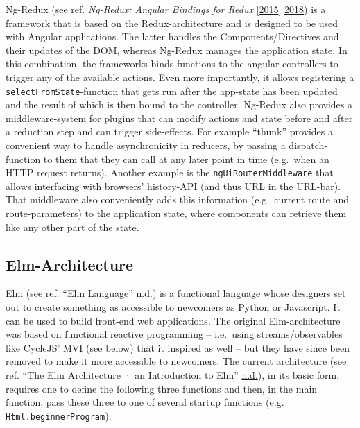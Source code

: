 \documentclass[a4paper,,tablecaptionabove]{scrbook}
\newcommand{\passthrough}[1]{#1}
\begin{document}
Ng-Redux (see ref. \emph{Ng-Redux: Angular Bindings for Redux}
{[}\protect\hyperlink{ref-ngreduxAngularbindings2018}{2015}{]}
\protect\hyperlink{ref-ngreduxAngularbindings2018}{2018}) is a framework
that is based on the Redux-architecture and is designed to be used with
Angular applications. The latter handles the Components/Directives and
their updates of the DOM, whereas Ng-Redux manages the application
state. In this combination, the frameworks binds functions to the
angular controllers to trigger any of the available actions. Even more
importantly, it allows registering a
\passthrough{\lstinline!selectFromState!}-function that gets run after
the app-state has been updated and the result of which is then bound to
the controller. Ng-Redux also provides a middleware-system for plugins
that can modify actions and state before and after a reduction step and
can trigger side-effects. For example \enquote{thunk} provides a
convenient way to handle asynchronicity in reducers, by passing a
dispatch-function to them that they can call at any later point in time
(e.g.~when an HTTP request returns). Another example is the
\passthrough{\lstinline!ngUiRouterMiddleware!} that allows interfacing
with browsers' history-API (and thus URL in the URL-bar). That
middleware also conveniently adds this information (e.g.~current route
and route-parameters) to the application state, where components can
retrieve them like any other part of the state.

\hypertarget{sec:elm-architecture}{%
\subsection{Elm-Architecture}\label{sec:elm-architecture}}

Elm (see ref. ``Elm Language''
\protect\hyperlink{ref-ElmLanguage}{n.d.}) is a functional language
whose designers set out to create something as accessible to newcomers
as Python or Javascript. It can be used to build front-end web
applications. The original Elm-architecture was based on functional
reactive programming -- i.e.~using streams/observables like CycleJS' MVI
(see below) that it inspired as well -- but they have since been removed
to make it more accessible to newcomers. The current architecture (see
ref. ``The Elm Architecture · an Introduction to Elm''
\protect\hyperlink{ref-ElmArchitectureIntroduction}{n.d.}), in its basic
form, requires one to define the following three functions and then, in
the main function, pass these three to one of several startup functions
(e.g. \passthrough{\lstinline!Html.beginnerProgram!}):
\end{document}
